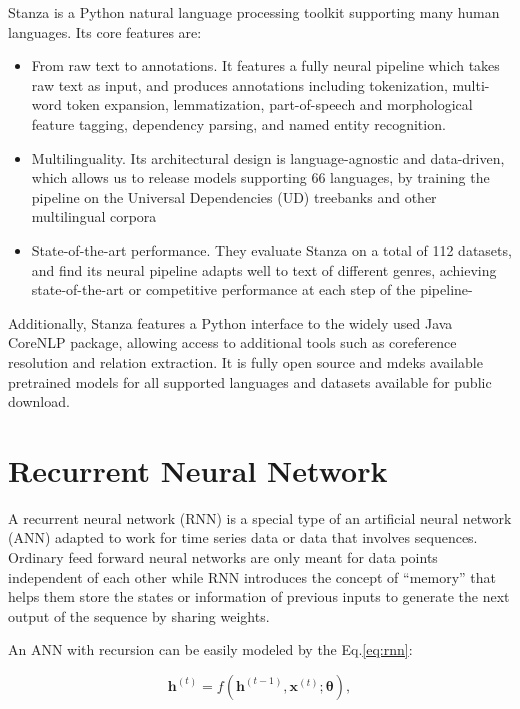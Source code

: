 Stanza \cite{qi2020stanza} is a Python natural language
processing toolkit supporting many human languages. Its core features are:
\begin{itemize}
  \item From raw text to annotations. It features a fully neural
  pipeline which takes raw text as input, and produces annotations
  including tokenization, multi-word token expansion, lemmatization,
  part-of-speech and morphological feature tagging, dependency
  parsing, and named entity recognition.
  \item Multilinguality. Its architectural design is language-agnostic
  and data-driven, which allows us to release models supporting 66
  languages, by training the pipeline on the Universal Dependencies
  (UD) treebanks and other multilingual corpora
  \item State-of-the-art performance. They evaluate Stanza on a total
  of 112 datasets, and find its neural pipeline adapts well to text of
  different genres, achieving state-of-the-art or competitive
  performance at each step of the pipeline-
\end{itemize}
Additionally, Stanza features a Python interface to the widely used
Java CoreNLP package, allowing access to additional tools such as
coreference resolution and relation extraction. It is fully open
source and mdeks available pretrained models for all supported
languages and datasets available for public download.

\section{Recurrent Neural Network}
\label{sec:rnn}

A recurrent neural network (RNN) is a special type of an artificial
neural network (ANN) adapted to work for time series data or data that
involves sequences. Ordinary feed forward neural networks are only
meant for data points independent of each other while RNN introduces
the concept of ``memory'' that helps them store the states or
information of previous inputs to generate the next output of the
sequence by sharing weights.

An ANN with recursion can be easily modeled by the Eq.\ref{eq:rnn}:

\begin{equation}
  \label{eq:rnn}
  \bm{h}^{(t)} = f ( \bm{h}^{(t - 1)}, \bm{x}^{(t)} ; \bm{\theta} ),
\end{equation}

